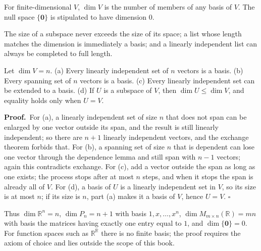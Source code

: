 \begin{definisi}[Dimension]
For finite-dimensional $V$, $\dim V$ is the number of members of any basis of $V$. The null space
$\{\mathbf{0}\}$ is stipulated to have dimension $0$.
\end{definisi}

The size of a subspace never exceeds the size of its space; a list whose length matches the
dimension is immediately a basis; and a linearly independent list can always be completed to full
length.

\begin{akibat}
Let $\dim V=n$. (a) Every linearly independent set of $n$ vectors is a basis.
(b) Every spanning set of $n$ vectors is a basis. (c) Every linearly independent set
can be extended to a basis. (d) If $U$ is a subspace of $V$, then $\dim U\le\dim V$, and
equality holds only when $U=V$.
\end{akibat}

\par\medskip\noindent\textbf{Proof.}\ 
For (a), a linearly independent set of size $n$ that does not span can be enlarged by one vector
outside its span, and the result is still linearly independent; so there are $n+1$ linearly
independent vectors, and the exchange theorem forbids that. For (b), a spanning set of size $n$
that is dependent can lose one vector through the dependence lemma and still span with $n-1$
vectors; again this contradicts exchange. For (c), add a vector outside the span as long as one
exists; the process stops after at most $n$ steps, and when it stops the span is already all of
$V$. For (d), a basis of $U$ is a linearly independent set in $V$, so its size is at most $n$; if
its size is $n$, part (a) makes it a basis of $V$, hence $U=V$.
\hfill$\square$\par\medskip

Thus $\dim\mathbb{R}^{n}=n$, $\dim P_{n}=n+1$ with basis $1,x,\dots,x^{n}$,
$\dim M_{m\times n}(\mathbb{R})=mn$ with basis the matrices having exactly one entry equal to $1$,
and $\dim\{\mathbf{0}\}=0$. For function spaces such as $\mathbb{R}^{\mathbb{R}}$ there is no
finite basis; the proof requires the axiom of choice and lies outside the scope of this book.



